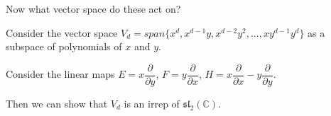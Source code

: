 \documentclass[]{report}
\theoremstyle{definition}
\numberwithin{theorem}{section}
\numberwithin{equation}{section}
\begin{document}
Now what vector space do these act on?

Consider the vector space $V_d = span\{ x^d, x^{d-1} y, x^{d-2} y^2, ..., x y^{d-1} y^d\}$ as a subspace of polynomials of $x$ and $y$. 

Consider the linear maps $E = x \dfrac{\partial}{\partial y}$, $F = y \dfrac{\partial}{\partial x}$, $H = x \dfrac{\partial}{\partial x} - y \dfrac{\partial}{\partial y}$. 

Then we can show that $V_d$ is an irrep of $\mathfrak{sl}_2(\mathbb{C})$. 
\end{document}
